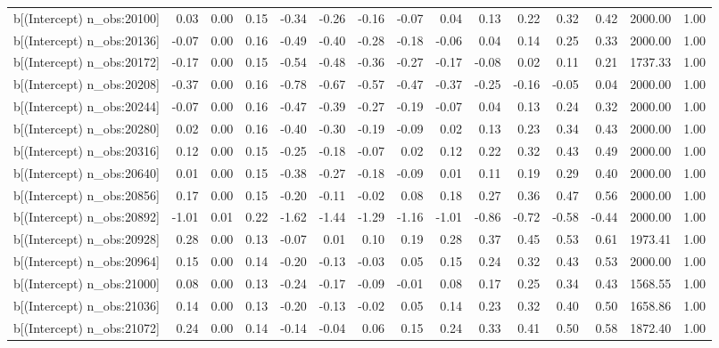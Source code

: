 \begin{table}[ht]
\begin{tabular}{rrrrrrrrrrrrrrr}
  b[(Intercept) n\_obs:20100] & 0.03 & 0.00 & 0.15 & -0.34 & -0.26 & -0.16 & -0.07 & 0.04 & 0.13 & 0.22 & 0.32 & 0.42 & 2000.00 & 1.00 \\ 
  b[(Intercept) n\_obs:20136] & -0.07 & 0.00 & 0.16 & -0.49 & -0.40 & -0.28 & -0.18 & -0.06 & 0.04 & 0.14 & 0.25 & 0.33 & 2000.00 & 1.00 \\ 
  b[(Intercept) n\_obs:20172] & -0.17 & 0.00 & 0.15 & -0.54 & -0.48 & -0.36 & -0.27 & -0.17 & -0.08 & 0.02 & 0.11 & 0.21 & 1737.33 & 1.00 \\ 
  b[(Intercept) n\_obs:20208] & -0.37 & 0.00 & 0.16 & -0.78 & -0.67 & -0.57 & -0.47 & -0.37 & -0.25 & -0.16 & -0.05 & 0.04 & 2000.00 & 1.00 \\ 
  b[(Intercept) n\_obs:20244] & -0.07 & 0.00 & 0.16 & -0.47 & -0.39 & -0.27 & -0.19 & -0.07 & 0.04 & 0.13 & 0.24 & 0.32 & 2000.00 & 1.00 \\ 
  b[(Intercept) n\_obs:20280] & 0.02 & 0.00 & 0.16 & -0.40 & -0.30 & -0.19 & -0.09 & 0.02 & 0.13 & 0.23 & 0.34 & 0.43 & 2000.00 & 1.00 \\ 
  b[(Intercept) n\_obs:20316] & 0.12 & 0.00 & 0.15 & -0.25 & -0.18 & -0.07 & 0.02 & 0.12 & 0.22 & 0.32 & 0.43 & 0.49 & 2000.00 & 1.00 \\ 
  b[(Intercept) n\_obs:20640] & 0.01 & 0.00 & 0.15 & -0.38 & -0.27 & -0.18 & -0.09 & 0.01 & 0.11 & 0.19 & 0.29 & 0.40 & 2000.00 & 1.00 \\ 
  b[(Intercept) n\_obs:20856] & 0.17 & 0.00 & 0.15 & -0.20 & -0.11 & -0.02 & 0.08 & 0.18 & 0.27 & 0.36 & 0.47 & 0.56 & 2000.00 & 1.00 \\ 
  b[(Intercept) n\_obs:20892] & -1.01 & 0.01 & 0.22 & -1.62 & -1.44 & -1.29 & -1.16 & -1.01 & -0.86 & -0.72 & -0.58 & -0.44 & 2000.00 & 1.00 \\ 
  b[(Intercept) n\_obs:20928] & 0.28 & 0.00 & 0.13 & -0.07 & 0.01 & 0.10 & 0.19 & 0.28 & 0.37 & 0.45 & 0.53 & 0.61 & 1973.41 & 1.00 \\ 
  b[(Intercept) n\_obs:20964] & 0.15 & 0.00 & 0.14 & -0.20 & -0.13 & -0.03 & 0.05 & 0.15 & 0.24 & 0.32 & 0.43 & 0.53 & 2000.00 & 1.00 \\ 
  b[(Intercept) n\_obs:21000] & 0.08 & 0.00 & 0.13 & -0.24 & -0.17 & -0.09 & -0.01 & 0.08 & 0.17 & 0.25 & 0.34 & 0.43 & 1568.55 & 1.00 \\ 
  b[(Intercept) n\_obs:21036] & 0.14 & 0.00 & 0.13 & -0.20 & -0.13 & -0.02 & 0.05 & 0.14 & 0.23 & 0.32 & 0.40 & 0.50 & 1658.86 & 1.00 \\ 
  b[(Intercept) n\_obs:21072] & 0.24 & 0.00 & 0.14 & -0.14 & -0.04 & 0.06 & 0.15 & 0.24 & 0.33 & 0.41 & 0.50 & 0.58 & 1872.40 & 1.00 \\ 

\end{tabular}
\end{table}
